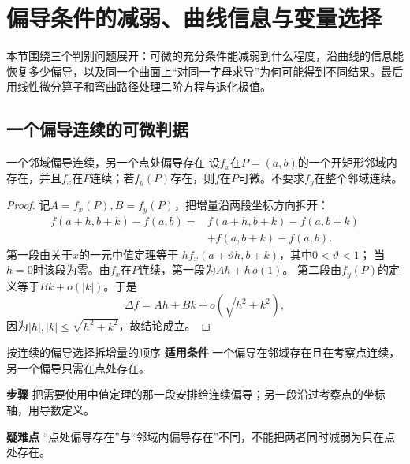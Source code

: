 \section{偏导条件的减弱、曲线信息与变量选择}\label{cmv:section}
\begin{examtip}
本节围绕三个判别问题展开：可微的充分条件能减弱到什么程度，沿曲线的信息能恢复多少偏导，以及同一个曲面上“对同一字母求导”为何可能得到不同结果。最后用线性微分算子和弯曲路径处理二阶方程与退化极值。
\end{examtip}

\subsection{一个偏导连续的可微判据}\label{cmv:onepartial}
\begin{theorem}{一个邻域偏导连续，另一个点处偏导存在}
设$f_x$在$P=(a,b)$的一个开矩形邻域内存在，并且$f_x$在$P$连续；若$f_y(P)$存在，则$f$在$P$可微。不要求$f_y$在整个邻域连续。
\end{theorem}
\begin{proof}
记$A=f_x(P),B=f_y(P)$，把增量沿两段坐标方向拆开：
\[
\begin{aligned}
f(a+h,b+k)-f(a,b)
={}&f(a+h,b+k)-f(a,b+k)\\
&+f(a,b+k)-f(a,b).
\end{aligned}
\]
第一段由关于$x$的一元中值定理等于
$h f_x(a+\vartheta h,b+k)$，其中$0<\vartheta<1$；
当$h=0$时该段为零。由$f_x$在$P$连续，第一段为$Ah+h\,o(1)$。
第二段由$f_y(P)$的定义等于$Bk+o(|k|)$。于是
\[
\Delta f=Ah+Bk+o\!\left(\sqrt{h^2+k^2}\right),
\]
因为$|h|,|k|\le\sqrt{h^2+k^2}$，故结论成立。
\end{proof}
\begin{method}{按连续的偏导选择拆增量的顺序}
\textbf{适用条件} 一个偏导在邻域存在且在考察点连续，另一个偏导只需在点处存在。\par
\textbf{步骤} 把需要使用中值定理的那一段安排给连续偏导；另一段沿过考察点的坐标轴，用导数定义。\par
\textbf{疑难点} “点处偏导存在”与“邻域内偏导存在”不同，不能把两者同时减弱为只在点处存在。
\end{method}
